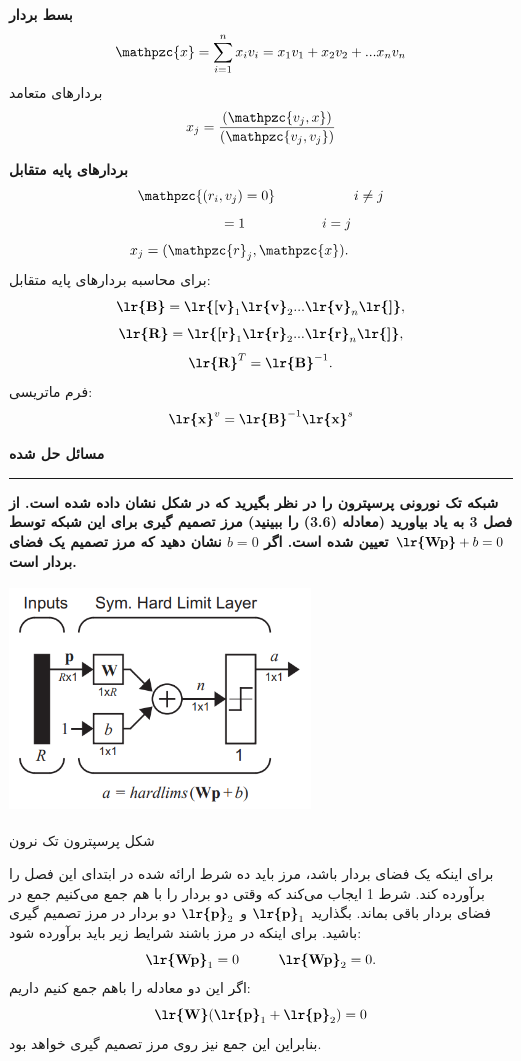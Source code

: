 \documentclass[a4paper,12pt]{report}
\begin{document}
     \textbf{\large{بسط بردار}}
     $$
     \mathpzc{x}=\sum_{i=1}^{n}x_iv_i=x_1v_1+x_2v_2+...x_nv_n
     $$
     بردارهای متعامد
     $$
     x_j=\frac{(\mathpzc{v_j,x})}{(\mathpzc{v_j,v_j})}
     $$
     
     \textbf{\large{بردارهای پایه متقابل}}
     $$
     \mathpzc{(r_i,v_j) = 0} \hspace{2cm} i \neq j
     $$
     $$
     \hspace{1.4cm} = 1 \hspace{2cm} i = j
     $$
     $$
     \hspace{-1.1cm} x_j=(\mathpzc{r}_j,\mathpzc{x}).
     $$
     برای محاسبه بردارهای پایه متقابل:
      $$
     \textbf{\lr{B}} = \textbf{\lr{[v}}_1 \textbf{\lr{v}}_2... \textbf{\lr{v}}_n\textbf{\lr{]}},
     $$
     $$
     \textbf{\lr{R}} = \textbf{\lr{[r}}_1 \textbf{\lr{r}}_2... \textbf{\lr{r}}_n\textbf{\lr{]}},
     $$
     $$
     \textbf{\lr{R}}^T=\textbf{\lr{B}}^{-1}.
     $$
     فرم ماتریسی:
     $$
     \textbf{\lr{x}}^v=\textbf{\lr{B}}^{-1}\textbf{\lr{x}}^s
     $$
     \vspace{10cm}
     
     \noindent\textbf{\Large{مسائل حل شده}}
     \hrule \vspace{0.3cm}
     
     \hspace{-2cm}\textbf{}
     \textbf
     {
     	شبکه تک نورونی پرسپترون را در نظر بگیرید که در شکل  نشان داده شده است. از فصل 3 به یاد بیاورید (معادله (3.6) را ببینید) مرز تصمیم گیری برای این شبکه توسط 
     	$ \textbf{\lr{Wp}}+b=0 $
     	تعیین شده است. اگر $ b = 0 $ نشان دهید که مرز تصمیم یک فضای بردار است.
     } 
     
      \begin{center}
      	\includegraphics[width=8cm, height=6cm]{138}
      	
      	شکل  پرسپترون تک نرون
      \end{center}
  برای اینکه یک فضای بردار باشد، مرز باید ده شرط ارائه شده در ابتدای این فصل را برآورده کند. شرط 1 ایجاب می‌کند که وقتی دو بردار را با هم جمع می‌کنیم جمع در فضای بردار باقی بماند. بگذارید
   $ \textbf{\lr{p}}_1 $
    و 
   $ \textbf{\lr{p}}_2 $
    دو بردار در مرز تصمیم گیری باشید. برای اینکه در مرز باشند شرایط زیر باید برآورده شود:
    $$
    \textbf{\lr{Wp}}_1=0 \hspace{1cm}
    \textbf{\lr{Wp}}_2=0.
    $$
    اگر این دو معادله را باهم جمع کنیم داریم:
    $$
    \textbf{\lr{W}}{(\textbf{\lr{p}}_1+\textbf{\lr{p}}_2)}=0
    $$
    بنابراین این جمع نیز روی مرز تصمیم گیری خواهد بود.\\
    
\end{document}
